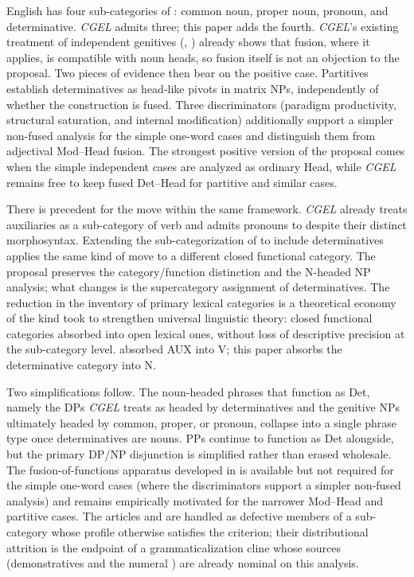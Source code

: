 \documentclass[12pt]{article}
\begin{document}
English has four sub-categories of : common noun, proper noun, pronoun, and determinative. \textit{CGEL} admits three; this paper adds the fourth. \textit{CGEL}'s existing treatment of independent genitives (, ) already shows that fusion, where it applies, is compatible with noun heads, so fusion itself is not an objection to the proposal. Two pieces of evidence then bear on the positive case. Partitives establish determinatives as head-like pivots in matrix NPs, independently of whether the construction is fused. Three discriminators (paradigm productivity, structural saturation, and internal modification) additionally support a simpler non-fused analysis for the simple one-word cases and distinguish them from adjectival Mod--Head fusion. The strongest positive version of the proposal comes when the simple independent cases are analyzed as ordinary Head, while \textit{CGEL} remains free to keep fused Det--Head for partitive and similar cases.

There is precedent for the move within the same framework. \textit{CGEL} already treats auxiliaries as a sub-category of verb \citep{pullumwilson1977} and admits pronouns to  despite their distinct morphosyntax. Extending the sub-categorization of  to include determinatives applies the same kind of move to a different closed functional category. The proposal preserves the category/function distinction and the N-headed NP analysis; what changes is the supercategory assignment of determinatives. The reduction in the inventory of primary lexical categories is a theoretical economy of the kind \textcite{pullumwilson1977} took to strengthen universal linguistic theory: closed functional categories absorbed into open lexical ones, without loss of descriptive precision at the sub-category level. \textcite{pullumwilson1977} absorbed AUX into V; this paper absorbs the determinative category into N.

Two simplifications follow. The noun-headed phrases that function as Det, namely the DPs \textit{CGEL} treats as headed by determinatives and the genitive NPs ultimately headed by common, proper, or pronoun, collapse into a single phrase type once determinatives are nouns. PPs continue to function as Det alongside, but the primary DP/NP disjunction is simplified rather than erased wholesale. The fusion-of-functions apparatus developed in \textcite{Payne2007} is available but not required for the simple one-word cases (where the discriminators support a simpler non-fused analysis) and remains empirically motivated for the narrower Mod--Head and partitive cases. The articles  and  are handled as defective members of a sub-category whose profile otherwise satisfies the criterion; their distributional attrition is the endpoint of a grammaticalization cline whose sources (demonstratives and the numeral ) are already nominal on this analysis.
\end{document}
